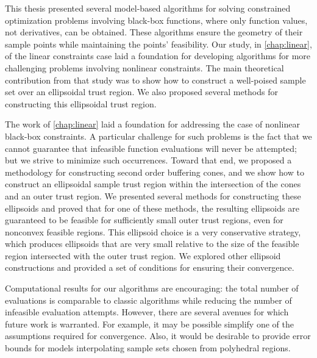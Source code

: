 This thesis presented several model-based algorithms for solving constrained optimization problems involving black-box functions, 
where only function values, not derivatives, can be obtained.
These algorithms ensure the geometry of their sample points while maintaining the points' feasibility.
Our study, in \cref{chap:linear}, of the linear constraints case laid a foundation for developing algorithms for more
challenging problems involving nonlinear constraints.  
The main theoretical contribution from that study was to show how to construct a well-poised sample set over an ellipsoidal trust region.
We also proposed several methods for constructing this ellipsoidal trust region.

The work of \cref{chap:linear} laid a foundation for addressing the case of nonlinear black-box constraints.
A particular challenge for such problems is the fact that we cannot guarantee that infeasible function evaluations will never be attempted;
but we strive to minimize such occurrences.
Toward that end, we proposed a methodology for constructing second order buffering cones, 
and we show how to construct an ellipsoidal sample trust region within the intersection of the cones and an outer trust region.
We presented several methods for constructing these ellipsoids and proved that for one of these methods,
the resulting ellipsoids are guaranteed to be feasible for sufficiently small outer trust regions, even for nonconvex feasible regions.
This ellipsoid choice is a very conservative strategy, 
which produces ellipsoids that are very small relative to the size of the feasible region intersected with the outer trust region.
We explored other ellipsoid constructions and provided a set of conditions for ensuring their convergence.

Computational results for our algorithms are encouraging: 
the total number of evaluations is comparable to classic algorithms while reducing the number of infeasible evaluation attempts.
However, there are several avenues for which future work is warranted.
For example, it may be possible simplify one of the assumptions required for convergence.
Also, it would be desirable to provide error bounds for models interpolating sample sets chosen from polyhedral regions.



